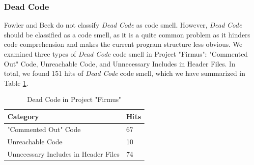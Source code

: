 



\subsubsection{Dead Code}
Fowler and Beck\cite{1999:RID:311424} do not classify \textit{Dead Code} as code smell. However, \textit{Dead Code} should be classified as a code smell, as it is a quite common problem as it hinders code comprehension and makes the current program structure less obvious\cite{mantyla2003taxonomy}. We examined three types of \textit{Dead Code} code smell in Project "Firmus": "Commented Out" Code, Unreachable Code, and Unnecessary Includes in Header Files. In total, we found 151 hits of \textit{Dead Code} code smell, which we have summarized in Table \ref{tab:deadCode}.

\begin{table}[ht!]
\centering
\caption{Dead Code in Project "Firmus"}
\label{tab:deadCode}
\begin{tabular}{|l|l|}
\hline
\textbf{Category}		& 	\textbf{Hits} \\ \hline
"Commented Out" Code 			&	67  \\ \hline
Unreachable Code 	& 	10	 \\ \hline
Unnecessary Includes in Header Files 	& 	74	 \\ \hline
\end{tabular}
\end{table}









\cleardoublepage































